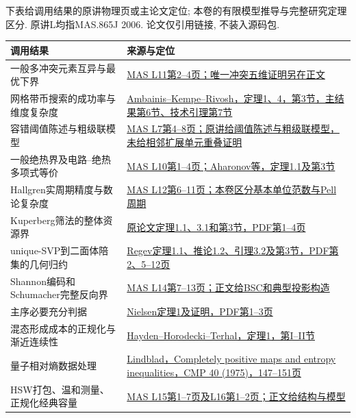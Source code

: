 下表给调用结果的原讲物理页或主论文定位; 本卷的有限模型推导与完整研究定理区分. 原讲L均指MAS.865J 2006. 论文仅引用链接, 不装入源码包.
\begin{longtable}{p{.28\linewidth}p{.63\linewidth}}
\toprule 调用结果 & 来源与定位\\\midrule\endhead
一般多冲突元素互异与最优下界 & \href{https://ocw.mit.edu/courses/mas-865j-quantum-information-science-spring-2006/0d7aea4e65f89ad0fffee1a9e5451828_lecture_11.pdf}{MAS L11第2--4页；唯一冲突五维证明另在正文}\\
网格带币搜索的成功率与维度复杂度 & \href{https://arxiv.org/abs/quant-ph/0402107}{Ambainis--Kempe--Rivosh，定理1、4，第3节，主结果第6节、技术引理第7节}\\
容错阈值陈述与粗级联模型 & \href{https://ocw.mit.edu/courses/mas-865j-quantum-information-science-spring-2006/7566f945d7af6676c18401680ede99ff_lecture_7.pdf}{MAS L7第4--8页；原讲给阈值陈述与粗级联模型，未给相邻扩展单元重叠证明}\\
一般绝热界及电路--绝热多项式等价 & \href{https://arxiv.org/abs/quant-ph/0405098}{MAS L10第1--4页；Aharonov等，定理1.1及第3节}\\
Hallgren实周期精度与数论复杂度 & \href{https://ocw.mit.edu/courses/mas-865j-quantum-information-science-spring-2006/3142d6105eea0fb1c2c6323c9c3f64e0_lecture_12.pdf}{MAS L12第6--11页；本卷区分基本单位范数与Pell周期}\\
Kuperberg筛法的整体资源界 & \href{https://arxiv.org/abs/quant-ph/0302112}{原论文定理1.1、3.1和第3节，PDF第1--4页}\\
unique-SVP到二面体陪集的几何归约 & \href{https://arxiv.org/abs/cs/0304005}{Regev定理1.1、推论1.2、引理3.2及第3节，PDF第2、5--12页}\\
Shannon编码和Schumacher完整反向界 & \href{https://ocw.mit.edu/courses/mas-865j-quantum-information-science-spring-2006/2b88645ad92377d5c37500fd856d7f9a_lecture_14.pdf}{MAS L14第7--13页；正文给BSC和典型投影构造}\\
主序必要充分判据 & \href{https://arxiv.org/abs/quant-ph/9811053}{Nielsen定理1及证明，PDF第1--3页}\\
混态形成成本的正规化与渐近连续性 & \href{https://arxiv.org/abs/quant-ph/0008134}{Hayden--Horodecki--Terhal，定理1，第I--II节}\\
量子相对熵数据处理 & \href{https://doi.org/10.1007/BF01609396}{Lindblad，Completely positive maps and entropy inequalities，CMP 40 (1975)，147--151页}\\
HSW打包、温和测量、正规化经典容量 & \href{https://ocw.mit.edu/courses/mas-865j-quantum-information-science-spring-2006/4266220604eb311dbba4869e942bcd67_lecture_15.pdf}{MAS L15第1--7页及L16第1--2页；正文给结构与模型}\\

\end{longtable}

